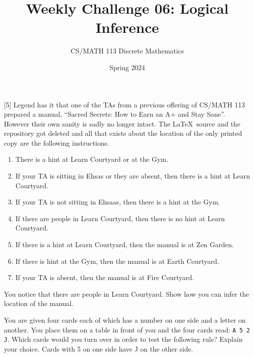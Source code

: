 \documentclass[a4paper]{exam}
\title{Weekly Challenge 06: Logical Inference}
\author{CS/MATH 113 Discrete Mathematics}
\date{Spring 2024}
\begin{document}
\maketitle

\begin{questions}

  [5] Legend has it that one of the TAs from a previous offering of CS/MATH 113 prepared a manual, ``Sacred Secrets: How to Earn an A+ and Stay Sane''. However their own sanity is sadly no longer intact. The \LaTeX\ source and the repository got deleted and all that exists about the location of the only printed copy are the following instructions.
  \begin{enumerate}
  \item There is a hint at Learn Courtyard or at the Gym.
  \item If your TA is sitting in Ehsas or they are absent, then there is a hint at Learn Courtyard.
  \item If your TA is not sitting in Ehsaas, then there is a hint at the Gym.
  \item If there are people in Learn Courtyard, then there is no hint at Learn Courtyard.
  \item If there is a hint at Learn Courtyard, then the manual is at Zen Garden.
  \item If there is hint at the Gym, then the manual is at Earth Courtyard.
  \item If your TA is absent, then the manual is at Fire Courtyard.
  \end{enumerate}
  You notice that there are people in Learn Courtyard. Show how you can infer the location of the manual.

  \begin{solution}
  \end{solution}

 You are given four cards each of which has a number on one side and a letter on another. You place them on a table in front of you and the four cards read: \texttt{A 5 2 J}. Which cards would you turn over in order to test the following rule? Explain your choice.
      {\quotation Cards with 5 on one side have J on the other side.}

  \begin{solution}
  \end{solution}

  
\end{questions}
\end{document}
